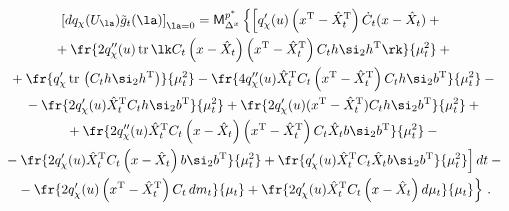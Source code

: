    \begin{multline}

    \left[ d q_\chi ( U_\la)  \tilde g_t (\la)\right]_{\la=0}

    ={\sf M}_{\Delta^x}^{p^*} \left\{ \left[ 

    \vphantom{\fr{2 q_\chi' (u) \left(x^{\mathrm{T}} -\hat X_t^{\mathrm{T}}\right) 

C_t\,dm_t}{\mu_t}}

q_\chi' (u) 

    \left(x^{\mathrm{T}}-\hat X_t^{\mathrm{T}}\right)

    \dot C_t (x-\hat X_t)+{}\right.\right.\\

{}+\fr{2q_\chi''(u)\,\mathrm{tr}\, \lk C_t 

\left (x-\hat    X_t\right)\left(x^{\mathrm{T}}-\hat X_t^{\mathrm{T}}\right) 

C_th\si_2 h^{\mathrm{T}}\rk}{\mu_t^2}+{}\\

{}+\fr{q_\chi'\,\mathrm{tr}\, \left(  C_t h\si_2 h^{\mathrm{T}}\right)}{\mu_t^2} - 

\fr{4q_\chi'' (u) \hat X_t^{\mathrm{T}} C_t \left(x^{\mathrm{T}}-\hat

    X_t^{\mathrm{T}}\right) C_t h\si_2 b^{\mathrm{T}}}{\mu_t^2} - {}\\

    {}-

    \fr{2q_\chi' (u)\hat X_t^{\mathrm{T}} C_t h

    \si_2 b^{\mathrm{T}}}{\mu_t^2} + 

    \fr{2q_\chi'(u)(x^{\mathrm{T}}- \hat X_t^{\mathrm{T}}) C_t h\si_2 

    b^{\mathrm{T}}}{\mu_t^2} + {}\\

    {}+

    \fr{2 q_\chi''(u)\hat X_t^{\mathrm{T}} C_t\left(x-\hat X_t\right) 

    \left(x^{\mathrm{T}}-\hat X_t^{\mathrm{T}}\right) C_t

    \hat X_t b\si_2 b^{\mathrm{T}}}{\mu_t^2}-{}\\

\left.{}- \fr{2q_\chi' (u)\hat X_t^{\mathrm{T}}

    C_t\left(x-\hat X_t\right) b\si_2 b^{\mathrm{T}}}{\mu_t^2} +

\fr{q_\chi '(u) \hat X_t^{\mathrm{T}} C_t\hat X_t b \si_2 b^{\mathrm{T}}}{\mu_t^2}\right] dt-{}\\

\left.{}-\fr{2 q_\chi' (u) \left(x^{\mathrm{T}} -\hat X_t^{\mathrm{T}}\right) 

C_t\,dm_t}{\mu_t} + \fr{2 q_\chi '(u)\hat X_t^{\mathrm{T}} 

C_t\left(x-\hat X_t\right) d\mu_t}{\mu_t}

\right\}\,.

\label{e3.22-s2}

\end{multline}

